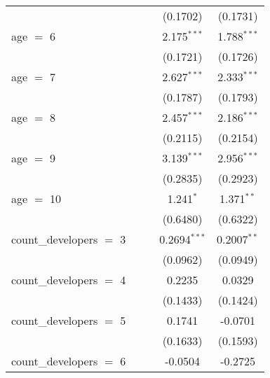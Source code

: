 \begin{tabular}{lcccc}
                                        &                &                & (0.1702)        & (0.1731)\\   
   age $=$ 6                            &                &                & 2.175$^{***}$   & 1.788$^{***}$\\   
                                        &                &                & (0.1721)        & (0.1726)\\   
   age $=$ 7                            &                &                & 2.627$^{***}$   & 2.333$^{***}$\\   
                                        &                &                & (0.1787)        & (0.1793)\\   
   age $=$ 8                            &                &                & 2.457$^{***}$   & 2.186$^{***}$\\   
                                        &                &                & (0.2115)        & (0.2154)\\   
   age $=$ 9                            &                &                & 3.139$^{***}$   & 2.956$^{***}$\\   
                                        &                &                & (0.2835)        & (0.2923)\\   
   age $=$ 10                           &                &                & 1.241$^{*}$     & 1.371$^{**}$\\   
                                        &                &                & (0.6480)        & (0.6322)\\   
   count\_developers $=$ 3              &                &                & 0.2694$^{***}$  & 0.2007$^{**}$\\   
                                        &                &                & (0.0962)        & (0.0949)\\   
   count\_developers $=$ 4              &                &                & 0.2235          & 0.0329\\   
                                        &                &                & (0.1433)        & (0.1424)\\   
   count\_developers $=$ 5              &                &                & 0.1741          & -0.0701\\   
                                        &                &                & (0.1633)        & (0.1593)\\   
   count\_developers $=$ 6              &                &                & -0.0504         & -0.2725\\   

\end{tabular}
